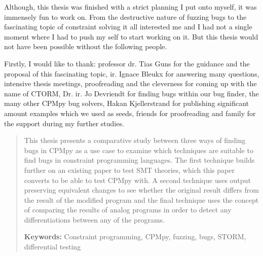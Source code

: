 \documentclass[master=cws,masteroption=se,english]{kulemt} %
\begin{document}
\begin{preface}
Although, this thesis was finished with a strict planning I put onto myself, it was immensely fun to work on. From the destructive nature of fuzzing bugs to the fascinating topic of constraint solving it all interested me and I had not a single moment where I had to push my self to start working on it. But this thesis would not have been possible without the following people.


\noindent Firstly, I would like to thank: 
professor dr. Tias Guns for the guidance and the proposal of this fascinating topic,
ir. Ignace Bleukx for answering many questions, intensive thesis meetings, proofreading and the cleverness for coming up with the name of CTORM, 
Dr. ir. Jo Devriendt for finding bugs within our bug finder, 
the many other CPMpy bug solvers, 
Hakan Kjellerstrand for publishing significant amount examples which we used as seeds,
friends for proofreading and 
family for the support during my further studies.
\end{preface}

\listoftodos
{}
\tableofcontents*
\setcounter{tocdepth}{5} %

\begin{abstract}
This thesis presents a comparative study between three ways of finding bugs in CPMpy as a use case to examine which techniques are suitable to find bugs in constraint programming languages. 
The first technique builds further on an existing paper to test SMT theories, which this paper converts to be able to test CPMpy with. 
A second technique uses output preserving equivalent changes to see whether the original result differs from the result of the modified program and 
the final technique uses the concept of comparing the results of analog programs in order to detect any differentiations between any of the programs. 


\textbf{Keywords:} Constraint programming, CPMpy, fuzzing, bugs, STORM, differential testing
\end{abstract}
\end{document}
